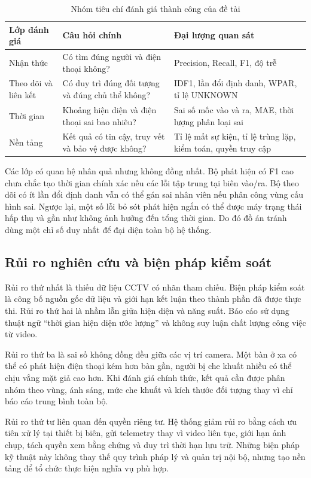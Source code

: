 \begin{table}[H]
\centering
\caption{Nhóm tiêu chí đánh giá thành công của đề tài}
\label{tab:success-criteria-ch1}
\begin{tabularx}{\textwidth}{p{3.2cm}X X}
\toprule
\textbf{Lớp đánh giá} & \textbf{Câu hỏi chính} & \textbf{Đại lượng quan sát}\\
\midrule
Nhận thức & Có tìm đúng người và điện thoại không? & Precision, Recall, F1, độ trễ\\
Theo dõi và liên kết & Có duy trì đúng đối tượng và đúng chủ thể không? & IDF1, lần đổi định danh, WPAR, tỉ lệ UNKNOWN\\
Thời gian & Khoảng hiện diện và điện thoại sai bao nhiêu? & Sai số mốc vào và ra, MAE, thời lượng phân loại sai\\
Nền tảng & Kết quả có tin cậy, truy vết và bảo vệ được không? & Tỉ lệ mất sự kiện, tỉ lệ trùng lặp, kiểm toán, quyền truy cập\\
\bottomrule
\end{tabularx}
\end{table}

Các lớp có quan hệ nhân quả nhưng không đồng nhất. Bộ phát hiện có F1 cao chưa chắc tạo thời gian chính xác nếu các lỗi tập trung tại biên vào/ra. Bộ theo dõi có ít lần đổi định danh vẫn có thể gán sai nhân viên nếu phân công vùng cấu hình sai. Ngược lại, một số lỗi bỏ sót phát hiện ngắn có thể được máy trạng thái hấp thụ và gần như không ảnh hưởng đến tổng thời gian. Do đó đồ án tránh dùng một chỉ số duy nhất để đại diện toàn bộ hệ thống.

\subsection{Rủi ro nghiên cứu và biện pháp kiểm soát}
Rủi ro thứ nhất là thiếu dữ liệu CCTV có nhãn tham chiếu. Biện pháp kiểm soát là công bố nguồn gốc dữ liệu và giới hạn kết luận theo thành phần đã được thực thi. Rủi ro thứ hai là nhầm lẫn giữa hiện diện và năng suất. Báo cáo sử dụng thuật ngữ ``thời gian hiện diện ước lượng'' và không suy luận chất lượng công việc từ video.

Rủi ro thứ ba là sai số không đồng đều giữa các vị trí camera. Một bàn ở xa có thể có phát hiện điện thoại kém hơn bàn gần, người bị che khuất nhiều có thể chịu vắng mặt giả cao hơn. Khi đánh giá chính thức, kết quả cần được phân nhóm theo vùng, ánh sáng, mức che khuất và kích thước đối tượng thay vì chỉ báo cáo trung bình toàn bộ.

Rủi ro thứ tư liên quan đến quyền riêng tư. Hệ thống giảm rủi ro bằng cách ưu tiên xử lý tại thiết bị biên, gửi telemetry thay vì video liên tục, giới hạn ảnh chụp, tách quyền xem bằng chứng và duy trì thời hạn lưu trữ. Những biện pháp kỹ thuật này không thay thế quy trình pháp lý và quản trị nội bộ, nhưng tạo nền tảng để tổ chức thực hiện nghĩa vụ phù hợp.

